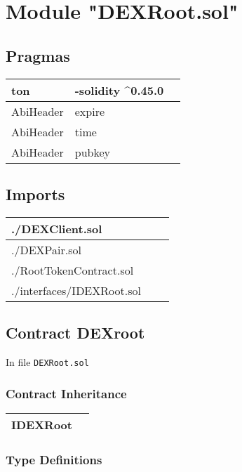 
\section{Module "DEXRoot.sol"}


\subsection{Pragmas}


\noindent\begin{tabular}{|l|l|p{5cm}|}\hline
ton & -solidity \^{}0.45.0 &\\\hline
AbiHeader &  expire &\\\hline
AbiHeader &  time &\\\hline
AbiHeader &  pubkey &\\\hline
\end{tabular}


\subsection{Imports}


\noindent\begin{tabular}{|l|l|p{5cm}|}\hline
./DEXClient.sol &\\\hline
./DEXPair.sol &\\\hline
./RootTokenContract.sol &\\\hline
./interfaces/IDEXRoot.sol &\\\hline
\end{tabular}


\subsection{Contract DEXroot}


In file {\tt DEXRoot.sol}

\subsubsection{Contract Inheritance}


\noindent\begin{tabular}{|l|p{5cm}|}\hline
IDEXRoot & \\\hline
\end{tabular}


\subsubsection{Type Definitions}


